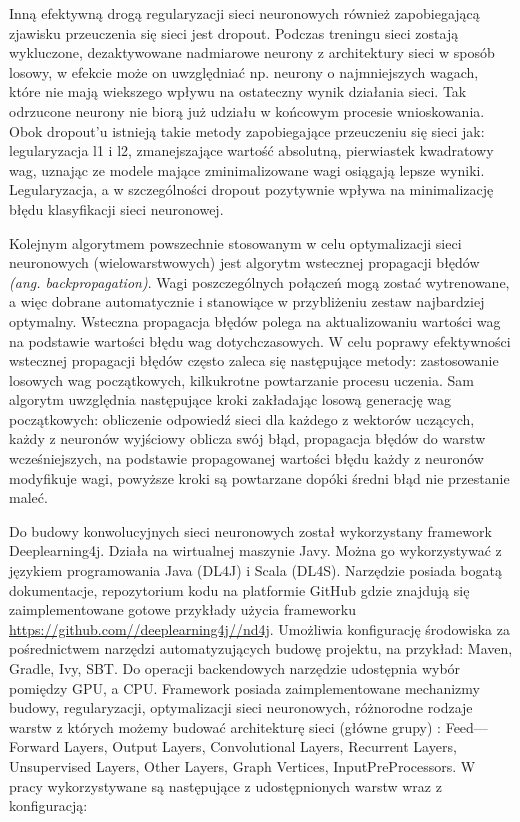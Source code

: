 \documentclass[a4paper,12pt]{article}
\begin{document}
        \par Inną efektywną drogą regularyzacji sieci neuronowych również zapobiegającą zjawisku przeuczenia się sieci jest dropout. 
			Podczas treningu sieci zostają wykluczone, dezaktywowane nadmiarowe neurony z architektury sieci w sposób losowy, 
			w efekcie może on uwzględniać np. neurony o najmniejszych wagach, które nie mają wiekszego wpływu na ostateczny wynik działania sieci. 
			Tak odrzucone neurony nie biorą już udziału w końcowym procesie wnioskowania. Obok dropout'u istnieją takie metody zapobiegające 
			przeuczeniu się sieci jak: legularyzacja l1 i l2, zmanejszające wartość absolutną, pierwiastek kwadratowy wag, uznając ze modele mające 
			zminimalizowane wagi osiągają lepsze wyniki. Legularyzacja, a w szczególności dropout pozytywnie wpływa na minimalizację błędu 
			klasyfikacji sieci neuronowej. 
        
			Kolejnym algorytmem powszechnie stosowanym w celu optymalizacji sieci neuronowych (wielowarstwowych) jest algorytm wstecznej propagacji błędów 
			\textit{(ang. backpropagation)}. Wagi poszczególnych połączeń mogą zostać wytrenowane, a więc dobrane automatycznie i stanowiące 
			w przybliżeniu zestaw najbardziej optymalny. Wsteczna propagacja błędów polega na aktualizowaniu wartości wag na podstawie wartości błędu 
			wag dotychczasowych. W celu poprawy efektywności wstecznej propagacji błędów często zaleca się następujące metody: 
			zastosowanie losowych wag początkowych, kilkukrotne powtarzanie procesu uczenia. Sam algorytm uwzględnia następujące kroki 
			zakładając losową generację wag początkowych: obliczenie odpowiedź sieci dla każdego z wektorów uczących, 
			każdy z neuronów wyjściowy oblicza swój błąd, propagacja błędów do warstw wcześniejszych, na podstawie propagowanej wartości 
			błędu każdy z neuronów modyfikuje wagi, powyższe kroki są powtarzane dopóki średni błąd nie przestanie maleć.

        \par Do budowy konwolucyjnych sieci neuronowych został wykorzystany framework Deeplearning4j. Działa na wirtualnej maszynie Javy. 
			Można go wykorzystywać z językiem programowania Java (DL4J) i Scala (DL4S). Narzędzie posiada bogatą dokumentacje, repozytorium kodu na 
			platformie GitHub gdzie znajdują się zaimplementowane gotowe przykłady użycia frameworku 
			\href{https://github.com//deeplearning4j//nd4j}{\url{https://github.com//deeplearning4j//nd4j}}. Umożliwia konfigurację środowiska 
			za pośrednictwem narzędzi automatyzujących budowę projektu, na przykład: Maven, Gradle, Ivy, SBT. Do operacji backendowych narzędzie 
			udostępnia wybór pomiędzy GPU, a CPU. Framework posiada zaimplementowane mechanizmy budowy, regularyzacji, optymalizacji sieci neuronowych, 
			różnorodne rodzaje warstw z których możemy budować architekturę sieci (główne grupy) : Feed---Forward Layers, Output Layers, Convolutional Layers, 
			Recurrent Layers,  Unsupervised Layers, Other Layers, Graph Vertices, InputPreProcessors. 
			W pracy wykorzystywane są następujące z udostępnionych warstw wraz z konfiguracją: 
\end{document}

